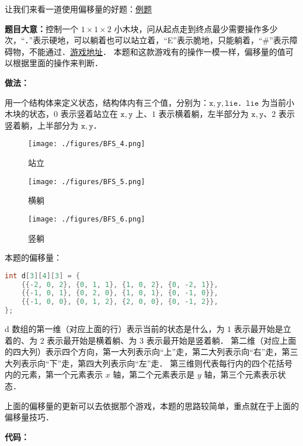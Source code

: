 让我们来看一道使用偏移量的好题：\href{http://poj.org/problem?id=3322}{例题}

\textbf{题目大意：}控制一个 $1 \times 1 \times 2$ 小木块，问从起点走到终点最少需要操作多少次，“．”表示硬地，可以躺着也可以站立着，“E”表示脆地，只能躺着，“#”表示障碍物，不能通过．\href{https://www.4399.com/flash/6860_3.htm}{游戏地址}．
本题和这款游戏有的操作一模一样，偏移量的值可以根据里面的操作来判断．

\textbf{做法：}

用一个结构体来定义状态，结构体内有三个值，分别为：$\mathtt{x, y, lie}$．$\mathtt{lie}$ 为当前小木块的状态，$0$ 表示竖着站立在 $\mathtt{x, y}$ 上、$1$ 表示横着躺，左半部分为 $\mathtt{x, y}$、$2$ 表示竖着躺，上半部分为 $\mathtt{x, y}$．

\begin{figure}[ht]
\centering
\texttt{[image: ./figures/BFS\_4.png]}
\caption{站立} \label{BFS_fig4}
\end{figure}
\begin{figure}[ht]
\centering
\texttt{[image: ./figures/BFS\_5.png]}
\caption{横躺} \label{BFS_fig5}
\end{figure}
\begin{figure}[ht]
\centering
\texttt{[image: ./figures/BFS\_6.png]}
\caption{竖躺} \label{BFS_fig6}
\end{figure}


本题的偏移量：
\begin{lstlisting}[language=cpp]
int d[3][4][3] = {
    {{-2, 0, 2}, {0, 1, 1}, {1, 0, 2}, {0, -2, 1}},  
    {{-1, 0, 1}, {0, 2, 0}, {1, 0, 1}, {0, -1, 0}},  
    {{-1, 0, 0}, {0, 1, 2}, {2, 0, 0}, {0, -1, 2}},  
};
\end{lstlisting}

d 数组的第一维（对应上面的行）表示当前的状态是什么，为 $1$ 表示最开始是立着的、为 $2$ 表示最开始是横着躺、为 $3$ 表示最开始是竖着躺．
第二维（对应上面的四大列）表示四个方向，第一大列表示向“上”走，第二大列表示向“右”走，第三大列表示向“下”走，第四大列表示向“左”走．
第三维则代表每行内的四个花括号内的元素，第一个元素表示 $x$ 轴，第二个元素表示是 $y$ 轴，第三个元素表示状态．

上面的偏移量的更新可以去依据那个游戏，本题的思路较简单，重点就在于上面的偏移量技巧．


\textbf{代码：}

